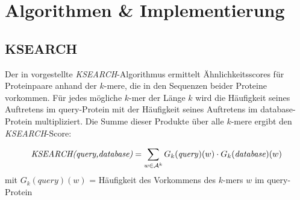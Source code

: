 \documentclass{article}
\begin{document}
\section{Algorithmen \& Implementierung}

\subsection{KSEARCH}
\label{ksearch}

Der in \cite{Holm} vorgestellte \emph{KSEARCH}-Algorithmus ermittelt Ähnlichkeitsscores für Proteinpaare anhand der $k$-mere, die in den Sequenzen beider Proteine vorkommen. Für jedes mögliche $k$-mer der Länge $k$ wird die Häufigkeit seines Auftretens im query-Protein mit der Häufigkeit seines Auftretens im database-Protein multipliziert. Die Summe dieser Produkte über alle $k$-mere ergibt den \emph{KSEARCH}-Score:

\begin{equation*}
\text{\emph{KSEARCH(query,database)}} = \sum_{w \in \mathcal A^k} G_k(\text{\emph{query}})(w) \cdot G_k(\text{\emph{database}})(w)
\end{equation*}  
mit
\emph{ $G_k(query)(w)$} = Häufigkeit des Vorkommens des $k$-mers $w$ im query-Protein\\ \\
\end{document}
